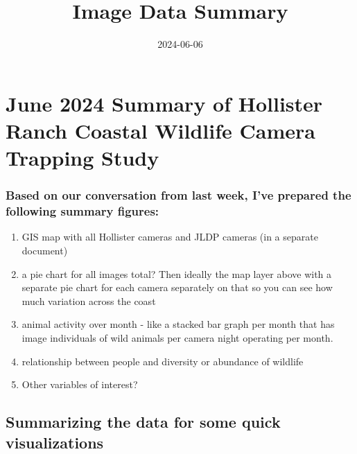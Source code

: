 \documentclass[
]{article}
\title{Image Data Summary}
\author{}
\date{\vspace{-2.5em}2024-06-06}
\providecommand{\tightlist}{%
  \setlength{\itemsep}{0pt}\setlength{\parskip}{0pt}}
\begin{document}
\maketitle

\section{June 2024 Summary of Hollister Ranch Coastal Wildlife Camera
Trapping
Study}\label{june-2024-summary-of-hollister-ranch-coastal-wildlife-camera-trapping-study}

\subsubsection{Based on our conversation from last week, I've prepared
the following summary
figures:}\label{based-on-our-conversation-from-last-week-ive-prepared-the-following-summary-figures}

\begin{enumerate}
\def\labelenumi{\arabic{enumi})}
\tightlist
\item
  GIS map with all Hollister cameras and JLDP cameras (in a separate
  document)
\item
  a pie chart for all images total? Then ideally the map layer above
  with a separate pie chart for each camera separately on that so you
  can see how much variation across the coast
\item
  animal activity over month - like a stacked bar graph per month that
  has image individuals of wild animals per camera night operating per
  month.\\
\item
  relationship between people and diversity or abundance of wildlife
\item
  Other variables of interest?
\end{enumerate}

\subsection{Summarizing the data for some quick
visualizations}\label{summarizing-the-data-for-some-quick-visualizations}
\end{document}
